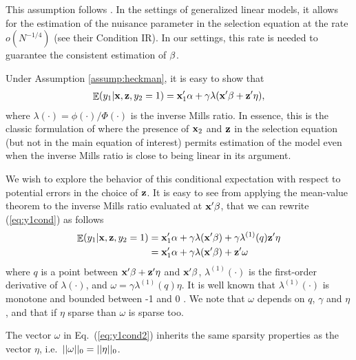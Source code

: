 \documentclass[11pt]{article}
\begin{document}
This assumption follows \cite{bellonichernozhukovwei2016}. In the settings of generalized linear models, it allows for the estimation of the nuisance parameter in the selection equation at the rate
$o(N^{-1/4})$ (see their Condition IR). In our settings, this rate is needed to guarantee the consistent estimation
of $\mathbf{\beta}$. %

Under Assumption \ref{assump:heckman}, it is easy to show that %
\begin{align}
\mathop{\mathbb{E}}(y_{1} | \mathbf{x}, \mathbf{z}, y_2 = 1) = \mathbf{x}_1'\alpha 
	+ \gamma \lambda(\mathbf{x}'\mathbf{\beta} + \mathbf{z}'\eta), \label{eq:y1cond}
\end{align}
where $\lambda(\cdot) = \phi(\cdot)/\Phi(\cdot)$ is the inverse Mills ratio.
In essence, this is the classic formulation of \cite{Heckman1979} where the presence of $\mathbf{x}_2$ and $\mathbf{z}$ in the selection equation (but not in the main equation of interest) permits estimation of the model even when the inverse Mills ratio is close to being linear in its argument\cite{}. 


We wish to explore the behavior of this conditional expectation with respect to potential errors in the choice of $\mathbf{z}$. It is easy to see from applying the mean-value theorem to the inverse Mills ratio evaluated at  %
%
$\mathbf{x}'\mathbf{\beta}$, %
that we can rewrite (\ref{eq:y1cond}) as follows %
\begin{align}
\mathop{\mathbb{E}}(y_{1} | \mathbf{x}, \mathbf{z}, y_2 = 1) 
	&= \mathbf{x}_1'\mathbf{\alpha} + \gamma \lambda(\mathbf{x}'\mathbf{\beta}) 
	+\gamma \lambda^{(1)}(q) \mathbf{z}'\eta \nonumber \\
	&= \mathbf{x}_1'\mathbf{\alpha} + \gamma \lambda(\mathbf{x}'\mathbf{\beta}) 
	+ \mathbf{z}'\omega  \label{eq:y1cond2}
\end{align}
where $q$ is a point between $\mathbf{x}'\mathbf{\beta} + \mathbf{z}'\eta$ and $\mathbf{x}'\mathbf{\beta}$,
$\lambda^{(1)}(\cdot)$ is the first-order derivative of $\lambda(\cdot)$,  and
$\omega = \gamma \lambda^{(1)}(q) \eta$. It is well known that $\lambda^{(1)}(\cdot)$ is monotone and bounded between -1 and 0 \cite[see, e.g.,][]{sampford:53}. We note that $\omega$ %
depends on $q$,  $\gamma$ and $\eta$, and that  %
if $\eta$ sparse than $\omega$ is sparse too. 
\begin{prop} \label{prop:sparseomega}
The vector $\omega$ in Eq.~(\ref{eq:y1cond2}) inherits the same  sparsity properties as the vector $\eta$, i.e.~$||\omega||_0=||\mathbf{\eta}||_0$.
\end{prop}
\end{document}

